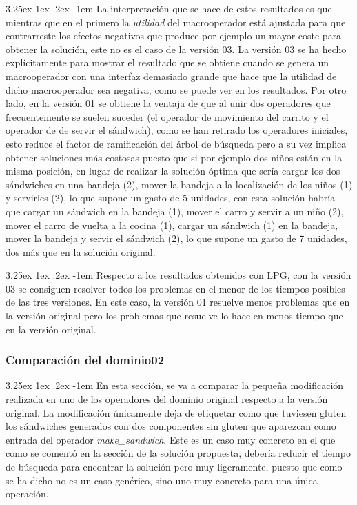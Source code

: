 \documentclass{article}
\makeatletter
\renewcommand\paragraph{\@startsection{paragraph}{5}{\z@}%
  {3.25ex \@plus1ex \@minus.2ex}%
  {-1em}%
  {\normalfont\normalsize\bfseries}}
\makeatother
\begin{document}
\paragraph{}
La interpretación que se hace de estos resultados es que mientras que en el primero la \textit{utilidad} del macrooperador está ajustada para que contrarreste los efectos negativos que produce por ejemplo un mayor coste para obtener la solución, este no es el caso de la versión 03. La versión 03 se ha hecho explícitamente para mostrar el resultado que se obtiene cuando se genera un macrooperador con una interfaz demasiado grande que hace que la utilidad de dicho macrooperador sea negativa, como se puede ver en los resultados. Por otro lado, en la versión 01 se obtiene la ventaja de que al unir dos operadores que frecuentemente se suelen suceder (el operador de movimiento del carrito y el operador de de servir el sándwich), como se han retirado los operadores iniciales, esto reduce el factor de ramificación del árbol de búsqueda pero a su vez implica obtener soluciones más costosas puesto que si por ejemplo dos niños están en la misma posición, en lugar de realizar la solución óptima que sería cargar los dos sándwiches en una bandeja (2), mover la bandeja a la localización de los niños (1) y servirles (2), lo que supone un gasto de 5 unidades, con esta solución habría que cargar un sándwich en la bandeja (1), mover el carro y servir a un niño (2), mover el carro de vuelta a la cocina (1), cargar un sándwich (1) en la bandeja, mover la bandeja y servir el sándwich (2), lo que supone un gasto de 7 unidades, dos más que en la solución original.

\paragraph{}
Respecto a los resultados obtenidos con LPG, con la versión 03 se consiguen resolver todos los problemas en el menor de los tiempos posibles de las tres versiones. En este caso, la versión 01 resuelve menos problemas que en la versión original pero los problemas que resuelve lo hace en menos tiempo que en la versión original.

\subsubsection{Comparación del dominio02}

\paragraph{}
En esta sección, se va a comparar la pequeña modificación realizada en uno de los operadores del dominio original respecto a la versión original. La modificación únicamente deja de etiquetar como que tuviesen gluten los sándwiches generados con dos componentes sin gluten que aparezcan como entrada del operador \textit{make\_sandwich}. Este es un caso muy concreto en el que como se comentó en la sección de la solución propuesta, debería reducir el tiempo de búsqueda para encontrar la solución pero muy ligeramente, puesto que como se ha dicho no es un caso genérico, sino uno muy concreto para una única operación.
\end{document}

